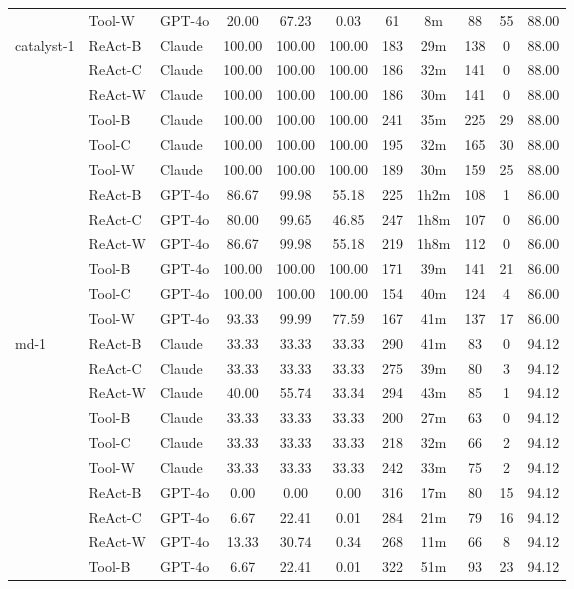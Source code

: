 \begin{longtable}{lllcccccccc}
 & Tool-W & GPT-4o & 20.00 & 67.23 & 0.03 & 61 & 8m & 88 & 55 & 88.00 \\
catalyst-1 & ReAct-B & Claude & 100.00 & 100.00 & 100.00 & 183 & 29m & 138 & 0 & 88.00 \\
 & ReAct-C & Claude & 100.00 & 100.00 & 100.00 & 186 & 32m & 141 & 0 & 88.00 \\
 & ReAct-W & Claude & 100.00 & 100.00 & 100.00 & 186 & 30m & 141 & 0 & 88.00 \\
 & Tool-B & Claude & 100.00 & 100.00 & 100.00 & 241 & 35m & 225 & 29 & 88.00 \\
 & Tool-C & Claude & 100.00 & 100.00 & 100.00 & 195 & 32m & 165 & 30 & 88.00 \\
 & Tool-W & Claude & 100.00 & 100.00 & 100.00 & 189 & 30m & 159 & 25 & 88.00 \\
 & ReAct-B & GPT-4o & 86.67 & 99.98 & 55.18 & 225 & 1h2m & 108 & 1 & 86.00 \\
 & ReAct-C & GPT-4o & 80.00 & 99.65 & 46.85 & 247 & 1h8m & 107 & 0 & 86.00 \\
 & ReAct-W & GPT-4o & 86.67 & 99.98 & 55.18 & 219 & 1h8m & 112 & 0 & 86.00 \\
 & Tool-B & GPT-4o & 100.00 & 100.00 & 100.00 & 171 & 39m & 141 & 21 & 86.00 \\
 & Tool-C & GPT-4o & 100.00 & 100.00 & 100.00 & 154 & 40m & 124 & 4 & 86.00 \\
 & Tool-W & GPT-4o & 93.33 & 99.99 & 77.59 & 167 & 41m & 137 & 17 & 86.00 \\
md-1 & ReAct-B & Claude & 33.33 & 33.33 & 33.33 & 290 & 41m & 83 & 0 & 94.12 \\
 & ReAct-C & Claude & 33.33 & 33.33 & 33.33 & 275 & 39m & 80 & 3 & 94.12 \\
 & ReAct-W & Claude & 40.00 & 55.74 & 33.34 & 294 & 43m & 85 & 1 & 94.12 \\
 & Tool-B & Claude & 33.33 & 33.33 & 33.33 & 200 & 27m & 63 & 0 & 94.12 \\
 & Tool-C & Claude & 33.33 & 33.33 & 33.33 & 218 & 32m & 66 & 2 & 94.12 \\
 & Tool-W & Claude & 33.33 & 33.33 & 33.33 & 242 & 33m & 75 & 2 & 94.12 \\
 & ReAct-B & GPT-4o & 0.00 & 0.00 & 0.00 & 316 & 17m & 80 & 15 & 94.12 \\
 & ReAct-C & GPT-4o & 6.67 & 22.41 & 0.01 & 284 & 21m & 79 & 16 & 94.12 \\
 & ReAct-W & GPT-4o & 13.33 & 30.74 & 0.34 & 268 & 11m & 66 & 8 & 94.12 \\
 & Tool-B & GPT-4o & 6.67 & 22.41 & 0.01 & 322 & 51m & 93 & 23 & 94.12 \\

\end{longtable}
